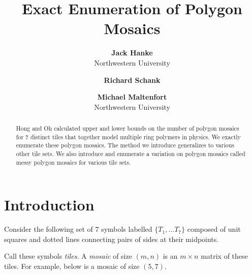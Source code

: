 \documentclass[12pt]{article}
\date{}
\author{
    \textbf{Jack Hanke}\\
    Northwestern University
    \and
    \textbf{Richard Schank}\\
    \and
    \textbf{Michael Maltenfort}\\
    Northwestern University
    }
\title{\textbf{Exact Enumeration of Polygon Mosaics}}
\theoremstyle{plain}
\theoremstyle{definition}
\theoremstyle{remark}
\theoremstyle{definition}
\newcommand{\cell}[4]{ \draw[thick] ( #1 , #2 ) rectangle ( #3 , #4 );}
\newcommand{\cellA}[4]{ \draw[thick] ( #1 , #2 ) rectangle ( #3 , #4 ); \draw[red, thick, densely dotted] (#3 * 0.5 + #1 * 0.5 , #2) -- (#3, #4 * 0.5 + #2 * 0.5);}
\newcommand{\cellB}[4]{ \draw[thick] ( #1 , #2 ) rectangle ( #3 , #4 ); \draw[red, thick, densely dotted] (#3 * 0.5 + #1 * 0.5 , #2) -- (#1, #4 * 0.5 + #2 * 0.5);}
\newcommand{\cellC}[4]{ \draw[thick] ( #1 , #2 ) rectangle ( #3 , #4 ); \draw[red, thick, densely dotted] (#3 * 0.5 + #1 * 0.5 , #4) -- (#1, #4 * 0.5 + #2 * 0.5);}
\newcommand{\cellD}[4]{ \draw[thick] ( #1 , #2 ) rectangle ( #3 , #4 ); \draw[red, thick, densely dotted] (#3 * 0.5 + #1 * 0.5 , #4) -- (#3, #4 * 0.5 + #2 * 0.5);}
\newcommand{\cellE}[4]{ \draw[thick] ( #1 , #2 ) rectangle ( #3 , #4 ); \draw[red, thick, densely dotted] (#3 * 0.5 + #1 * 0.5 , #2) -- (#3 * 0.5 + #1 * 0.5 , #4);}
\newcommand{\cellF}[4]{ \draw[thick] ( #1 , #2 ) rectangle ( #3 , #4 ); \draw[red, thick, densely dotted] (#3, #4 * 0.5 + #2 * 0.5) -- (#1, #4 * 0.5 + #2 * 0.5);}
\newcommand{\lablnode}[3]{\node[shape=circle,draw=none,fill=none, inner sep=0pt,minimum size=0pt] (A) at ( #1 , #2 ) {#3};}
\begin{document}
\maketitle

\begin{center}

    \begin{abstract}
        Hong and Oh calculated upper and lower bounds on the number of polygon mosaics for $7$ distinct tiles that together model multiple ring polymers in physics. We exactly enumerate these polygon mosaics. The method we introduce generalizes to various other tile sets. We also introduce and enumerate a variation on polygon mosaics called messy polygon mosaics for various tile sets.
    \end{abstract}

\end{center}

\section{Introduction}

Consider the following set of $7$ symbols labelled $\{ T_1, \dots T_7 \}$ composed of unit squares and dotted lines connecting pairs of sides at their midpoints.

\begin{center}
\end{center}

Call these symbols \textit{tiles}. A \textit{mosaic} of size $(m,n)$ is an $m \times n$ matrix of these tiles. For example, below is a mosaic of size $(5,7)$.
\end{document}
